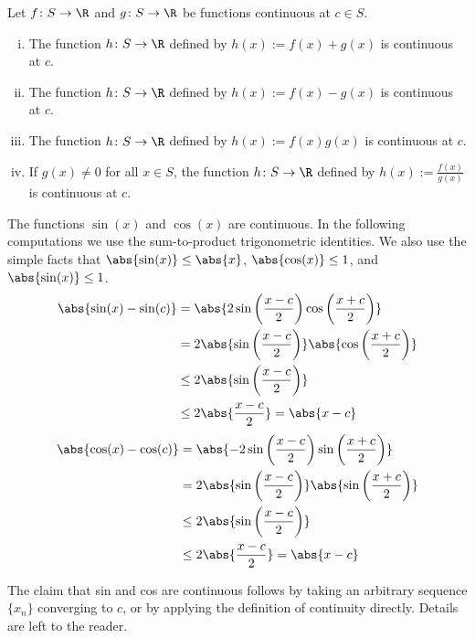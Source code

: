 \documentclass[12pt]{book}
\begin{document}
\begin{prop} \label{contalg:prop}
Let $f \colon S \to \R$ and $g \colon S \to \R$ be functions
continuous at $c \in S$.
\begin{enumerate}[(i)]
\item The function $h \colon S \to \R$ defined by
$h(x) := f(x)+g(x)$ is continuous at $c$.
\item The function $h \colon S \to \R$ defined by
$h(x) := f(x)-g(x)$ is continuous at $c$.
\item The function $h \colon S \to \R$ defined by
$h(x) := f(x)g(x)$ is continuous at $c$.
\item If $g(x)\not=0$ for all $x \in S$, the function $h \colon S \to \R$
defined by $h(x) := \frac{f(x)}{g(x)}$ is continuous at $c$.
\end{enumerate}
\end{prop}

\begin{example} \label{sincos:example}
The functions $\sin(x)$ and $\cos(x)$ are continuous.
In the following computations we use the sum-to-product
trigonometric identities.
We also use the simple facts that
$\abs{\sin(x)} \leq \abs{x}$, $\abs{\cos(x)} \leq 1$,
and $\abs{\sin(x)} \leq 1$.
\begin{equation*}
\begin{split}
\abs{\sin(x)-\sin(c)} & =
\abs{
2 \sin \left( \frac{x-c}{2} \right) \cos \left( \frac{x+c}{2} \right)
}
\\
& =
2
\abs{ \sin \left( \frac{x-c}{2} \right) }
\abs{ \cos \left( \frac{x+c}{2} \right) }
\\
& \leq
2
\abs{ \sin \left( \frac{x-c}{2} \right) }
\\
& \leq
2
\abs{ \frac{x-c}{2} }
= \abs{x-c}
\end{split}
\end{equation*}
\begin{equation*}
\begin{split}
\abs{\cos(x)-\cos(c)} & =
\abs{
-2 \sin \left( \frac{x-c}{2} \right) \sin \left( \frac{x+c}{2} \right)
}
\\
& =
2
\abs{ \sin \left( \frac{x-c}{2} \right) }
\abs{ \sin \left( \frac{x+c}{2} \right) }
\\
& \leq
2
\abs{ \sin \left( \frac{x-c}{2} \right) }
\\
& \leq
2
\abs{ \frac{x-c}{2} }
= \abs{x-c}
\end{split}
\end{equation*}

The claim that sin and cos are continuous follows by taking an
arbitrary sequence $\{ x_n \}$ converging to $c$, or by applying the
definition of continuity directly.
Details are left to the
reader.
\end{example}
\end{document}
